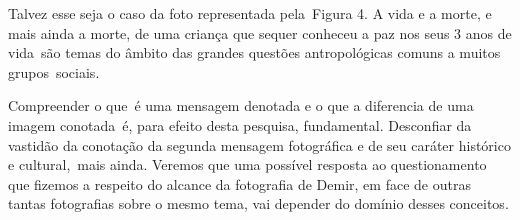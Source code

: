 \documentclass[
  letterpaper,
  a4paper,
  12pt]{scrbook}
\begin{document}
Talvez esse seja o caso da foto representada pela~Figura 4. A vida e a
morte, e mais ainda a morte, de uma criança que sequer conheceu a paz
nos seus 3 anos de vida~são temas do âmbito das grandes questões
antropológicas comuns a muitos grupos~sociais.

Compreender o que~é uma mensagem denotada e o que a diferencia de uma
imagem conotada~é, para efeito desta pesquisa, fundamental. Desconfiar
da vastidão da conotação da segunda mensagem fotográfica e de seu
caráter histórico e cultural,~mais ainda. Veremos que uma possível
resposta ao questionamento que fizemos a respeito do alcance da
fotografia de Demir, em face de outras tantas fotografias sobre o mesmo
tema, vai depender do domínio desses conceitos.


\backmatter
\printbibliography
\end{document}
